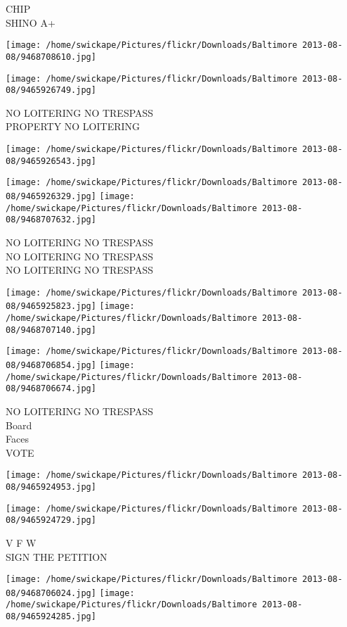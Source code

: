 \documentclass[10pt,letterpaper]{article}
\begin{document}
CHIP\\
SHINO A+
\pagebreak

\texttt{[image: /home/swickape/Pictures/flickr/Downloads/Baltimore 2013-08-08/9468708610.jpg]}

\vspace{0.25in}
\texttt{[image: /home/swickape/Pictures/flickr/Downloads/Baltimore 2013-08-08/9465926749.jpg]}

NO LOITERING NO TRESPASS\\
PROPERTY NO LOITERING
\pagebreak

\texttt{[image: /home/swickape/Pictures/flickr/Downloads/Baltimore 2013-08-08/9465926543.jpg]}

\vspace{0.25in}
\texttt{[image: /home/swickape/Pictures/flickr/Downloads/Baltimore 2013-08-08/9465926329.jpg]}
\texttt{[image: /home/swickape/Pictures/flickr/Downloads/Baltimore 2013-08-08/9468707632.jpg]}

NO LOITERING NO TRESPASS\\
NO LOITERING NO TRESPASS\\
NO LOITERING NO TRESPASS
\pagebreak

\texttt{[image: /home/swickape/Pictures/flickr/Downloads/Baltimore 2013-08-08/9465925823.jpg]}
\texttt{[image: /home/swickape/Pictures/flickr/Downloads/Baltimore 2013-08-08/9468707140.jpg]}

\texttt{[image: /home/swickape/Pictures/flickr/Downloads/Baltimore 2013-08-08/9468706854.jpg]}
\texttt{[image: /home/swickape/Pictures/flickr/Downloads/Baltimore 2013-08-08/9468706674.jpg]}

NO LOITERING NO TRESPASS\\
Board\\
Faces\\
VOTE
\pagebreak

\texttt{[image: /home/swickape/Pictures/flickr/Downloads/Baltimore 2013-08-08/9465924953.jpg]}

\vspace{0.25in}
\texttt{[image: /home/swickape/Pictures/flickr/Downloads/Baltimore 2013-08-08/9465924729.jpg]}

V F W\\
SIGN THE PETITION
\pagebreak

\texttt{[image: /home/swickape/Pictures/flickr/Downloads/Baltimore 2013-08-08/9468706024.jpg]}
\texttt{[image: /home/swickape/Pictures/flickr/Downloads/Baltimore 2013-08-08/9465924285.jpg]}
\end{document}
